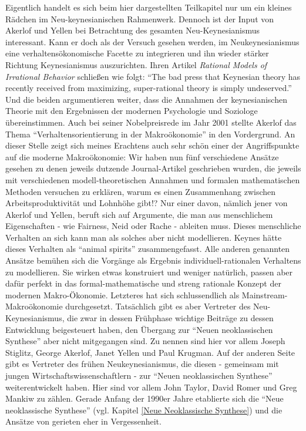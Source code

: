 Eigentlich handelt es sich beim hier dargestellten Teilkapitel nur um ein kleines Rädchen im  Neu-keynesianischen Rahmenwerk. Dennoch ist der Input von Akerlof und Yellen bei Betrachtung des gesamten Neu-Keynesianismus interessant. Kann er doch als der Versuch gesehen werden, im Neukeynesianismus eine verhaltensökonomische Facette zu integrieren und ihn wieder stärker Richtung Keynesianismus auszurichten. Ihren Artikel \textit{Rational Models of Irrational Behavior} schließen \textcite{AkerlofYellen1987} wie folgt: "`The bad press that Keynesian theory has recently received from maximizing, super-rational theory is simply undeserved."' Und die beiden argumentieren weiter, dass die Annahmen der keynesianischen Theorie mit den Ergebnissen der modernen Psychologie und Soziologe übereinstimmen. Auch bei seiner Nobelpreisrede im Jahr 2001 stellte Akerlof \textcite{Nobelpreis-Komitee2001} das Thema "`Verhaltensorientierung in der Makroökonomie"' in den Vordergrund. An dieser Stelle zeigt sich meines Erachtens auch sehr schön einer der Angriffspunkte auf die moderne Makroökonomie: Wir haben nun fünf verschiedene Ansätze gesehen zu denen jeweils dutzende Journal-Artikel geschrieben wurden, die jeweils mit verschiedenen modell-theoretischen Annahmen und formalen mathematischen Methoden versuchen zu erklären, warum es einen Zusammenhang zwischen Arbeitsproduktivität und Lohnhöhe gibt!? Nur einer davon, nämlich jener von Akerlof und Yellen, beruft sich auf Argumente, die man aus menschlichem Eigenschaften -  wie Fairness, Neid oder Rache - ableiten muss. Dieses menschliche Verhalten an sich kann man als solches aber nicht modellieren. Keynes hätte dieses Verhalten als "`animal spirits"' zusammengefasst. Alle anderen genannten Ansätze bemühen sich die Vorgänge als Ergebnis individuell-rationalen Verhaltens zu modellieren. Sie wirken etwas konstruiert und weniger natürlich, passen aber dafür perfekt in das formal-mathematische und streng rationale Konzept der modernen Makro-Ökonomie. Letzteres hat sich schlussendlich als Mainstream-Makroökonomie durchgesetzt. Tatsächlich gibt es aber Vertreter des Neu-Keynesianismus, die zwar in dessen Frühphase wichtige Beiträge zu dessen Entwicklung beigesteuert haben, den Übergang zur "`Neuen neoklassischen Synthese"' aber nicht mitgegangen sind. Zu nennen sind hier vor allem Joseph Stiglitz, George Akerlof, Janet Yellen und Paul Krugman. Auf der anderen Seite gibt es Vertreter des frühen Neukeynesianismus, die diesen - gemeinsam mit jungen Wirtschaftswissenschaftlern - zur "`Neuen neoklassischen Synthese"' weiterentwickelt haben. Hier sind vor allem John Taylor, David Romer und Greg Mankiw zu zählen. Gerade Anfang der 1990er Jahre etablierte sich die "`Neue neoklassische Synthese"' (vgl. Kapitel \ref{Neue Neoklassische Synthese}) und die Ansätze von \textcite{AkerlofYellen1990} gerieten eher in Vergessenheit.

